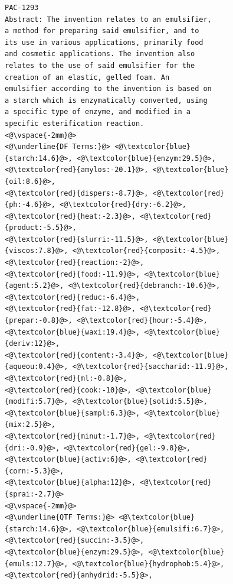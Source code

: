 \begin{figure}[t!]
\begin{framed}
\vspace*{-2ex}
  \centering
 \begin{lstlisting}[basicstyle=\scriptsize\ttfamily , linewidth=\columnwidth,breaklines=true] 
PAC-1293
Abstract: The invention relates to an emulsifier, 
a method for preparing said emulsifier, and to 
its use in various applications, primarily food 
and cosmetic applications. The invention also 
relates to the use of said emulsifier for the 
creation of an elastic, gelled foam. An 
emulsifier according to the invention is based on 
a starch which is enzymatically converted, using 
a specific type of enzyme, and modified in a 
specific esterification reaction.
<@\vspace{-2mm}@>
<@\underline{DF Terms:}@> <@\textcolor{blue}{starch:14.6}@>, <@\textcolor{blue}{enzym:29.5}@>, <@\textcolor{red}{amylos:-20.1}@>, <@\textcolor{blue}{oil:8.6}@>,
<@\textcolor{red}{dispers:-8.7}@>, <@\textcolor{red}{ph:-4.6}@>, <@\textcolor{red}{dry:-6.2}@>, <@\textcolor{red}{heat:-2.3}@>, <@\textcolor{red}{product:-5.5}@>,
<@\textcolor{red}{slurri:-11.5}@>, <@\textcolor{blue}{viscos:7.8}@>, <@\textcolor{red}{composit:-4.5}@>, <@\textcolor{red}{reaction:-2}@>, 
<@\textcolor{red}{food:-11.9}@>, <@\textcolor{blue}{agent:5.2}@>, <@\textcolor{red}{debranch:-10.6}@>, <@\textcolor{red}{reduc:-6.4}@>, 
<@\textcolor{red}{fat:-12.8}@>, <@\textcolor{red}{prepar:-0.8}@>, <@\textcolor{red}{hour:-5.4}@>, <@\textcolor{blue}{waxi:19.4}@>, <@\textcolor{blue}{deriv:12}@>,
<@\textcolor{red}{content:-3.4}@>, <@\textcolor{blue}{aqueou:0.4}@>, <@\textcolor{red}{saccharid:-11.9}@>, <@\textcolor{red}{ml:-0.8}@>, 
<@\textcolor{red}{cook:-10}@>, <@\textcolor{blue}{modifi:5.7}@>, <@\textcolor{blue}{solid:5.5}@>, <@\textcolor{blue}{sampl:6.3}@>, <@\textcolor{blue}{mix:2.5}@>, 
<@\textcolor{red}{minut:-1.7}@>, <@\textcolor{red}{dri:-0.9}@>, <@\textcolor{red}{gel:-9.8}@>, <@\textcolor{blue}{activ:6}@>, <@\textcolor{red}{corn:-5.3}@>, 
<@\textcolor{blue}{alpha:12}@>, <@\textcolor{red}{sprai:-2.7}@> 
<@\vspace{-2mm}@>
<@\underline{QTF Terms:}@> <@\textcolor{blue}{starch:14.6}@>, <@\textcolor{blue}{emulsifi:6.7}@>, <@\textcolor{red}{succin:-3.5}@>, 
<@\textcolor{blue}{enzym:29.5}@>, <@\textcolor{blue}{emuls:12.7}@>, <@\textcolor{blue}{hydrophob:5.4}@>, <@\textcolor{red}{anhydrid:-5.5}@>, 

\end{lstlisting}
\end{framed}
\end{figure}
